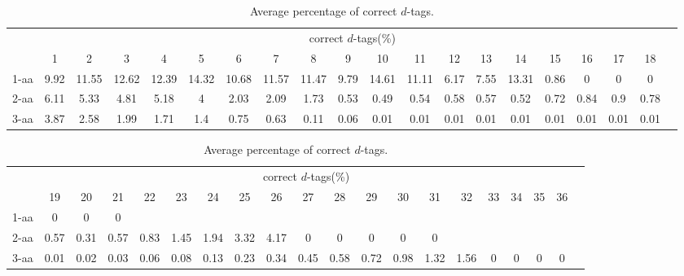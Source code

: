 \begin{table}[h]\tiny
\vspace{3mm}
{\centering
\begin{center}
\begin{tabular}{|l|c|c|c|c|c|c|c|c|c|c|c|c|c|c|c|c|c|c|c|}
  \hline
  & \multicolumn{ 18 }{|c|}{correct $d$-tags(\%)} \\
  \cline{2- 19}
    & 1 & 2 & 3 & 4 & 5 & 6 & 7 & 8 & 9 & 10 & 11 & 12 & 13 & 14 & 15 & 16 & 17 & 18\\
  \hline
1-aa  & 9.92 & 11.55 & 12.62 & 12.39 & 14.32 & 10.68 & 11.57 & 11.47 & 9.79 & 14.61 & 11.11 & 6.17 & 7.55 & 13.31 & 0.86 & 0 & 0 & 0\\
2-aa  & 6.11 & 5.33 & 4.81 & 5.18 & 4 & 2.03 & 2.09 & 1.73 & 0.53 & 0.49 & 0.54 & 0.58 & 0.57 & 0.52 & 0.72 & 0.84 & 0.9 & 0.78\\
3-aa  & 3.87 & 2.58 & 1.99 & 1.71 & 1.4 & 0.75 & 0.63 & 0.11 & 0.06 & 0.01 & 0.01 & 0.01 & 0.01 & 0.01 & 0.01 & 0.01 & 0.01 & 0.01\\
 \hline
\end{tabular}
\end{center}
\par}
\centering
\caption{ Average percentage of correct $d$-tags.}
\vspace{3mm}
\label{table:correct-d-tags}
\end{table}
\begin{table}[h]\tiny
\vspace{3mm}
{\centering
\begin{center}
\begin{tabular}{|l|c|c|c|c|c|c|c|c|c|c|c|c|c|c|c|c|c|c|c|}
  \hline
  & \multicolumn{ 18 }{|c|}{correct $d$-tags(\%)} \\
  \cline{2- 19}
    & 19 & 20 & 21 & 22 & 23 & 24 & 25 & 26 & 27 & 28 & 29 & 30 & 31 & 32 & 33 & 34 & 35 & 36\\
  \hline
1-aa  & 0 & 0 & 0 &  &  &  &  &  &  &  &  &  &  &  &  &  &  & \\
2-aa  & 0.57 & 0.31 & 0.57 & 0.83 & 1.45 & 1.94 & 3.32 & 4.17 & 0 & 0 & 0 & 0 & 0 &  &  &  &  & \\
3-aa  & 0.01 & 0.02 & 0.03 & 0.06 & 0.08 & 0.13 & 0.23 & 0.34 & 0.45 & 0.58 & 0.72 & 0.98 & 1.32 & 1.56 & 0 & 0 & 0 & 0\\
 \hline
\end{tabular}
\end{center}
\par}
\centering
\caption{ Average percentage of correct $d$-tags.}
\vspace{3mm}
\label{table:correct-d-tags}
\end{table}
